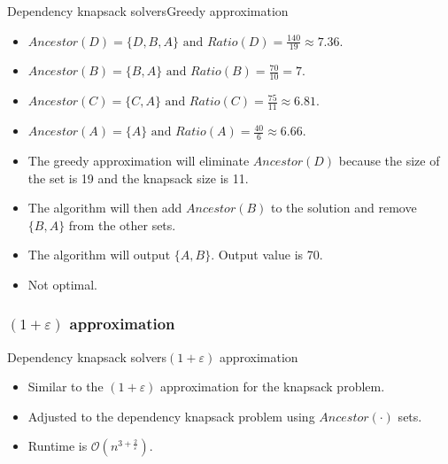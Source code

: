 \documentclass{beamer}
\begin{document}
\begin{frame}{Dependency knapsack solvers}{Greedy approximation} %
    \begin{example}
         \begin{itemize}
            \item {$ Ancestor(D) = \{D,B,A\} \text{ and } 
            Ratio(D) = \frac{140}{19} \approx 7.36$.} \pause
            \item {$ Ancestor(B) = \{B,A\} \text{ and } 
            Ratio(B) = \frac{70}{10} = 7$.} \pause{}
            \item {$ Ancestor(C) = \{C,A\} \text{ and } 
            Ratio(C) = \frac{75}{11} \approx 6.81$.} \pause
            \item {$ Ancestor(A) = \{A\} \text{ and } 
            Ratio(A) = \frac{40}{6} \approx 6.66$.} \pause
            \item {The greedy approximation will eliminate $Ancestor(D)$
             because the size of the set 
             is 19 and the knapsack size is 11.} \pause {}
            \item {The algorithm will then add $Ancestor(B)$ to the 
            solution and remove $\{B,A\}$ from the other sets.} \pause
            \item {The algorithm will output $\{A,B\}$. Output value 
            is 70.} \pause 
            \item {Not optimal.}
        \end{itemize}
    \end{example}
\end{frame}

\subsubsection*{$(1+\varepsilon)$ approximation}

\begin{frame}{Dependency knapsack solvers}{$(1+\varepsilon)$ approximation}
    \begin{itemize}
        \item {Similar to the $(1+\varepsilon)$ approximation for the 
        knapsack problem.}
        \item {Adjusted to the dependency knapsack problem using 
        $Ancestor(\cdot)$ sets.}
        \item {Runtime is $\mathcal{O}(n^{3+\frac{2}{\varepsilon}})$.}
    \end{itemize}
\end{frame}
\end{document}
